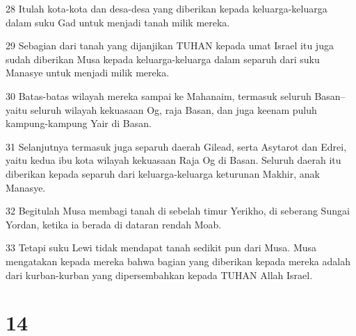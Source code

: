 \par 28 Itulah kota-kota dan desa-desa yang diberikan kepada keluarga-keluarga dalam suku Gad untuk menjadi tanah milik mereka.
\par 29 Sebagian dari tanah yang dijanjikan TUHAN kepada umat Israel itu juga sudah diberikan Musa kepada keluarga-keluarga dalam separuh dari suku Manasye untuk menjadi milik mereka.
\par 30 Batas-batas wilayah mereka sampai ke Mahanaim, termasuk seluruh Basan--yaitu seluruh wilayah kekuasaan Og, raja Basan, dan juga keenam puluh kampung-kampung Yair di Basan.
\par 31 Selanjutnya termasuk juga separuh daerah Gilead, serta Asytarot dan Edrei, yaitu kedua ibu kota wilayah kekuasaan Raja Og di Basan. Seluruh daerah itu diberikan kepada separuh dari keluarga-keluarga keturunan Makhir, anak Manasye.
\par 32 Begitulah Musa membagi tanah di sebelah timur Yerikho, di seberang Sungai Yordan, ketika ia berada di dataran rendah Moab.
\par 33 Tetapi suku Lewi tidak mendapat tanah sedikit pun dari Musa. Musa mengatakan kepada mereka bahwa bagian yang diberikan kepada mereka adalah dari kurban-kurban yang dipersembahkan kepada TUHAN Allah Israel.

\chapter{14}

